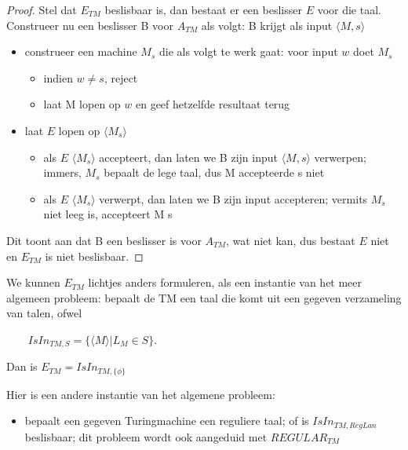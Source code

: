 \begin{proof}
Stel dat $E_{TM}$ beslisbaar is, dan bestaat er een beslisser $E$ voor
die taal. Construeer nu een beslisser B voor $A_{TM}$ als volgt: B
krijgt als input $\langle M,s \rangle$
\begin{itemize}
\item 
construeer een machine $M_s$ die als volgt te werk gaat: voor input
$w$ doet $M_s$ 
\begin{itemize}
\item indien $w \neq s$, reject
\item laat M lopen op $w$ en geef hetzelfde resultaat terug
\end{itemize}

\item 
laat $E$ lopen op $\langle M_s \rangle$
\begin{itemize}
\item als $E$ $\langle M_s \rangle$ accepteert, dan laten we B zijn input $\langle M,s \rangle$
verwerpen; immers, $M_s$ bepaalt de lege taal, dus M accepteerde s
niet
\item als $E$ $\langle M_s \rangle$ verwerpt, dan laten we B zijn input accepteren;
vermits $M_s$ niet leeg is, accepteert M s
\end{itemize}

\end{itemize}
Dit toont aan dat B een beslisser is voor $A_{TM}$, wat niet kan, dus
bestaat $E$ niet en $E_{TM}$ is niet beslisbaar.
\end{proof}


We kunnen $E_{TM}$ lichtjes anders formuleren, als een instantie van
het meer algemeen probleem: bepaalt de TM een taal die komt uit een
gegeven verzameling van talen, ofwel

$~~~~~~~~~IsIn_{TM,S} = \{\langle M \rangle| L_M \in S\}$.


Dan is $E_{TM} = IsIn_{TM,\{\phi\}}$


Hier is een andere instantie van het algemene probleem:
\begin{itemize}
\item[] bepaalt een gegeven Turingmachine een reguliere taal; of is
$IsIn_{TM,RegLan}$ beslisbaar; dit probleem wordt ook aangeduid met
$REGULAR_{TM}$
\end{itemize}

